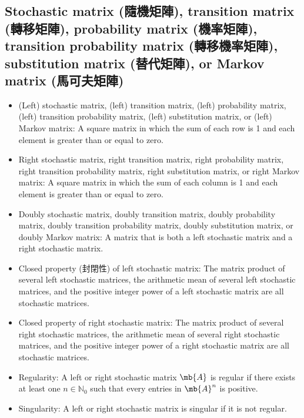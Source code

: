 \documentclass[a4paper,12pt]{report}
\begin{document}
\subsection{Stochastic matrix (隨機矩陣), transition matrix (轉移矩陣), probability matrix (機率矩陣), transition probability matrix (轉移機率矩陣), substitution matrix (替代矩陣), or Markov matrix (馬可夫矩陣)}
\begin{itemize}
\item (Left) stochastic matrix, (left) transition matrix, (left) probability matrix, (left) transition probability matrix, (left) substitution matrix, or (left) Markov matrix: A square matrix in which the sum of each row is 1 and each element is greater than or equal to zero.
\item Right stochastic matrix, right transition matrix, right probability matrix, right transition probability matrix, right substitution matrix, or right Markov matrix: A square matrix in which the sum of each column is 1 and each element is greater than or equal to zero.
\item Doubly stochastic matrix, doubly transition matrix, doubly probability matrix, doubly transition probability matrix, doubly substitution matrix, or doubly Markov matrix: A matrix that is both a left stochastic matrix and a right stochastic matrix.
\item Closed property (封閉性) of left stochastic matrix: The matrix product of several left stochastic matrices, the arithmetic mean of several left stochastic matrices, and the positive integer power of a left stochastic matrix are all stochastic matrices.
\item Closed property of right stochastic matrix: The matrix product of several right stochastic matrices, the arithmetic mean of several right stochastic matrices, and the positive integer power of a right stochastic matrix are all stochastic matrices.
\item Regularity: A left or right stochastic matrix $\mb{A}$ is regular if there exists at least one $n\in\mathbb{N}_0$ such that every entries in $\mb{A}^n$ is positive.
\item Singularity: A left or right stochastic matrix is singular if it is not regular.
\end{itemize}
\end{document}
